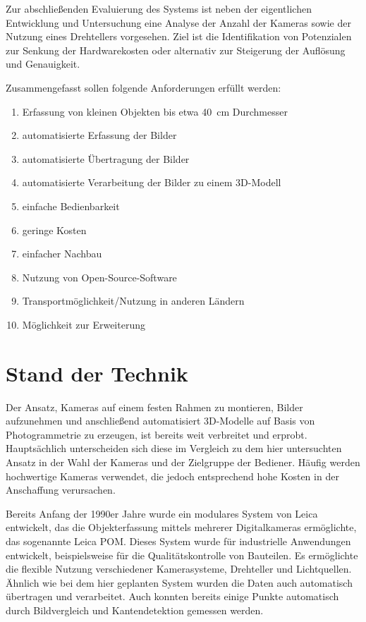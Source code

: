 \documentclass[./00PhotoBox]{subfiles}
\begin{document}
Zur abschließenden Evaluierung des Systems ist neben der eigentlichen Entwicklung und Untersuchung eine Analyse der Anzahl der Kameras sowie der Nutzung eines Drehtellers vorgesehen. Ziel ist die Identifikation von Potenzialen zur Senkung der Hardwarekosten oder alternativ zur Steigerung der Auflösung und Genauigkeit.

Zusammengefasst sollen folgende Anforderungen erfüllt werden:

\begin{enumerate}
    \item Erfassung von kleinen Objekten bis etwa \SI{40}{\centi\metre} Durchmesser
    \item automatisierte Erfassung der Bilder
    \item automatisierte Übertragung der Bilder
    \item automatisierte Verarbeitung der Bilder zu einem 3D-Modell
    \item einfache Bedienbarkeit
    \item geringe Kosten
    \item einfacher Nachbau
    \item Nutzung von Open-Source-Software
    \item Transportmöglichkeit/Nutzung in anderen Ländern
    \item Möglichkeit zur Erweiterung
\end{enumerate}

\section{Stand der Technik}
Der Ansatz, Kameras auf einem festen Rahmen zu montieren, Bilder aufzunehmen und anschließend automatisiert 3D-Modelle auf Basis von Photogrammetrie zu erzeugen, ist bereits weit verbreitet und erprobt. Hauptsächlich unterscheiden sich diese im Vergleich zu dem hier untersuchten Ansatz in der Wahl der Kameras und der Zielgruppe der Bediener. Häufig werden hochwertige Kameras verwendet, die jedoch entsprechend hohe Kosten in der Anschaffung verursachen.

Bereits Anfang der 1990er Jahre wurde ein modulares System von Leica entwickelt, das die Objekterfassung mittels mehrerer Digitalkameras ermöglichte, das sogenannte Leica POM. Dieses System wurde für industrielle Anwendungen entwickelt, beispielsweise für die Qualitätskontrolle von Bauteilen. Es ermöglichte die flexible Nutzung verschiedener Kamerasysteme, Drehteller und Lichtquellen. Ähnlich wie bei dem hier geplanten System wurden die Daten auch automatisch übertragen und verarbeitet. Auch konnten bereits einige Punkte automatisch durch Bildvergleich und Kantendetektion gemessen werden.
\citep{leica_pom_concept}
\end{document}
